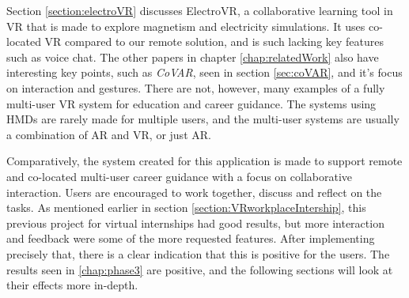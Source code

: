 Section \ref{section:electroVR} discusses ElectroVR, a collaborative learning tool in VR that is made to explore magnetism and electricity simulations. It uses co-located VR compared to our remote solution, and is such lacking key features such as voice chat. The other papers in chapter \ref{chap:relatedWork} also have interesting key points, such as \textit{CoVAR}, seen in section \ref{sec:coVAR}, and it's focus on interaction and gestures. There are not, however, many examples of a fully multi-user VR system for education and career guidance. The systems using HMDs are rarely made for multiple users, and the multi-user systems are usually a combination of AR and VR, or just AR.

Comparatively, the system created for this application is made to support remote and co-located multi-user career guidance with a focus on collaborative interaction. Users are encouraged to work together, discuss and reflect on the tasks. As mentioned earlier in section \ref{section:VRworkplaceIntership}, this previous project for virtual internships had good results, but more interaction and feedback were some of the more requested features. After implementing precisely that, there is a clear indication that this is positive for the users. The results seen in \ref{chap:phase3} are positive, and the following sections will look at their effects more in-depth.

